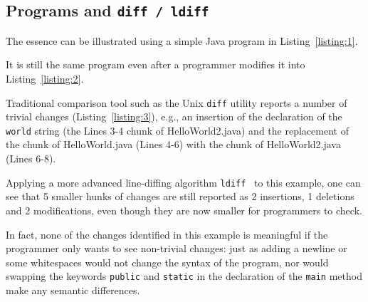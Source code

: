 \documentclass{acm_proc_article-sp}
\begin{document}
\subsection{Programs and {\tt diff / ldiff}}
The essence can be illustrated using a simple Java program in Listing~\ref{listing:1}.


It is still the same program even after a programmer modifies it into Listing~\ref{listing:2}.

Traditional comparison tool such as the Unix {\tt diff} utility reports a number of trivial changes (Listing~\ref{listing:3}), e.g.,
an insertion of the declaration of the {\tt world} string (the Lines 3-4 chunk of HelloWorld2.java) and the replacement of the chunk of HelloWorld.java (Lines 4-6) with the chunk of HelloWorld2.java (Lines 6-8).
%

Applying a more advanced line-diffing algorithm {\tt ldiff}~\cite{canfora09software} to this example, one can see that 5 smaller hunks of changes are still reported as 2 insertions, 1 deletions and 2 modifications, even though they are now smaller for programmers to check.


In fact, none of the changes identified in this example is meaningful if the programmer only wants to see non-trivial
changes: just as adding a newline or some whitespaces would not change the syntax of the program, nor would swapping the keywords {\tt public} and {\tt static} in the declaration of the {\tt main} method make any semantic differences.
\end{document}
